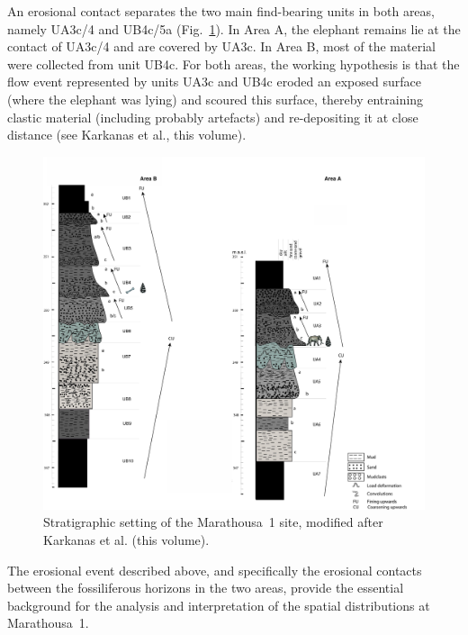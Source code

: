 \documentclass[review,authoryear,times]{elsarticle} %
\begin{document}
An erosional contact separates the two main find-bearing units in both areas, namely UA3c/4 and UB4c/5a (Fig.~\ref{fig:2}). In Area A, the elephant remains lie at the contact of UA3c/4 and are covered by UA3c. In Area B, most of the material were collected from unit UB4c. For both areas, the working hypothesis is that the flow event represented by units UA3c and UB4c eroded an exposed surface (where the elephant was lying) and scoured this surface, thereby entraining clastic material (including probably artefacts) and re-depositing it at close distance (see Karkanas et al., this volume).

\begin{figure}[]
  \centering
  \includegraphics[width=1\textwidth]{../artwork/Fig2.pdf}
  \caption{Stratigraphic setting of the Marathousa~1 site, modified after Karkanas et al. (this volume).}
  \label{fig:2}
\end{figure}

The erosional event described above, and specifically the erosional contacts between the fossiliferous horizons in the two areas, provide the essential background for the analysis and interpretation of the spatial distributions at Marathousa~1.
\end{document}

